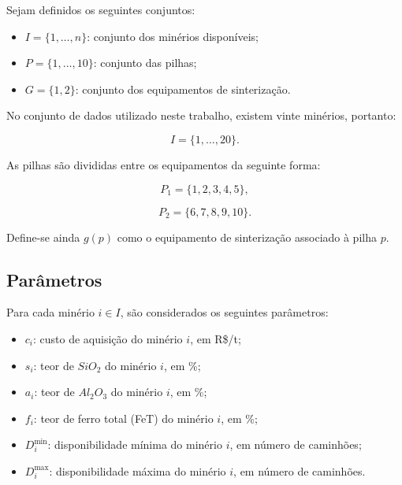 \documentclass[12pt,a4paper]{article}
\begin{document}
Sejam definidos os seguintes conjuntos:

\begin{itemize}
    \item $I = \{1,\ldots,n\}$: conjunto dos minérios disponíveis;
    \item $P = \{1,\ldots,10\}$: conjunto das pilhas;
    \item $G = \{1,2\}$: conjunto dos equipamentos de sinterização.
\end{itemize}

No conjunto de dados utilizado neste trabalho, existem vinte minérios,
portanto:

\begin{equation}
    I = \{1,\ldots,20\}.
\end{equation}

As pilhas são divididas entre os equipamentos da seguinte forma:

\begin{equation}
    P_1 = \{1,2,3,4,5\},
\end{equation}

\begin{equation}
    P_2 = \{6,7,8,9,10\}.
\end{equation}

Define-se ainda $g(p)$ como o equipamento de sinterização associado à
pilha $p$.



\subsection{Parâmetros}

Para cada minério $i \in I$, são considerados os seguintes parâmetros:

\begin{itemize}

    \item $c_i$: custo de aquisição do minério $i$, em R\$/t;

    \item $s_i$: teor de $SiO_2$ do minério $i$, em \%;

    \item $a_i$: teor de $Al_2O_3$ do minério $i$, em \%;

    \item $f_i$: teor de ferro total (FeT) do minério $i$, em \%;

    \item $D_i^{\min}$: disponibilidade mínima do minério $i$,
    em número de caminhões;

    \item $D_i^{\max}$: disponibilidade máxima do minério $i$,
    em número de caminhões.

\end{itemize}
\end{document}
